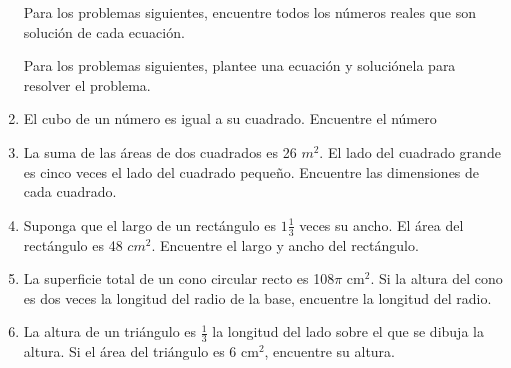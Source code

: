 \documentclass[10pt,twoside]{article}
\begin{document}
\begin{enumerate}
Para los problemas siguientes, encuentre todos los números reales que son solución de cada ecuación.
Para los problemas siguientes, plantee una ecuación y soluciónela para resolver el problema.
\item El cubo de un número es igual a su cuadrado. Encuentre el número
\item La suma de las áreas de dos cuadrados es 26 $m^{2}$. El lado del cuadrado grande es cinco veces el lado del cuadrado pequeño. Encuentre las dimensiones de cada cuadrado.
\item Suponga que el largo de un rectángulo es $1\frac{1}{3}$ veces su ancho. El área del rectángulo es 48 $cm^{2}$. Encuentre el largo y ancho del rectángulo.
\item La superficie total de un cono circular recto es 108$\pi$ cm$^{2}$. Si la altura del cono es dos veces la longitud del radio de la base, encuentre la longitud del radio.
\item La altura de un triángulo es $\frac{1}{3}$ la longitud del lado sobre el que se dibuja la altura. Si el área del triángulo es 6 cm$^{2}$, encuentre su altura.
\end{enumerate}
\end{document}
